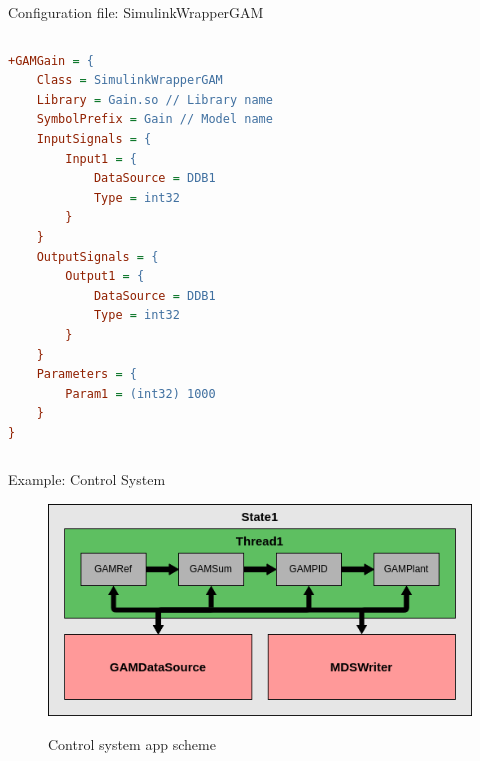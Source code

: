 \begin{frame}[fragile]{Configuration file: SimulinkWrapperGAM}
	\begin{columns}
		\begin{lstlisting}[style=small, language = cfg]
+GAMGain = {
    Class = SimulinkWrapperGAM
    Library = Gain.so // Library name
    SymbolPrefix = Gain // Model name
    InputSignals = {
        Input1 = {
            DataSource = DDB1
            Type = int32
        }
    }
    OutputSignals = {
        Output1 = {
            DataSource = DDB1
            Type = int32
        }
    }
    Parameters = {
        Param1 = (int32) 1000
    }
}\end{lstlisting}
	\end{columns}
\end{frame}

\begin{frame}{Example: Control System}
	\begin{figure}
		\centering
		\includegraphics[scale=0.55]{ControlSystem.png}
		\label{fig:control}
		\caption{Control system app scheme}
	\end{figure}
\end{frame}
